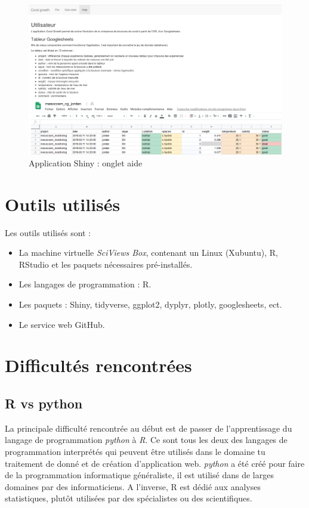 \documentclass[]{report}
\begin{document}
\begin{figure}[h!]
\includegraphics[]{../image/aide.PNG}
\caption{Application Shiny : onglet aide}
\end{figure}

\null
\newpage

\section{Outils utilisés}\label{outils-utilises}

Les outils utilisés sont :

\begin{itemize}
\item
  La machine virtuelle \emph{SciViews Box}, contenant un Linux
  (Xubuntu), R, RStudio et les paquets nécessaires pré-installés.
\item
  Les langages de programmation : R.
\item
  Les paquets : Shiny, tidyverse, ggplot2, dyplyr, plotly, googlesheets,
  ect.
\item
  Le service web GitHub.
\end{itemize}

\section{Difficultés rencontrées}\label{difficultes-rencontrees}

\subsection{R vs python}\label{r-vs-python}

La principale difficulté rencontrée au début est de passer de
l'apprentissage du langage de programmation \emph{python} à \emph{R}. Ce
sont tous les deux des langages de programmation interprétés qui peuvent
être utilisés dans le domaine tu traitement de donné et de création
d'application web. \emph{python} a été créé pour faire de la
programmation informatique généraliste, il est utilisé dans de larges
domaines par des informaticiens. A l'inverse, R est dédié aux analyses
statistiques, plutôt utilisées par des spécialistes ou des
scientifiques.
\end{document}

